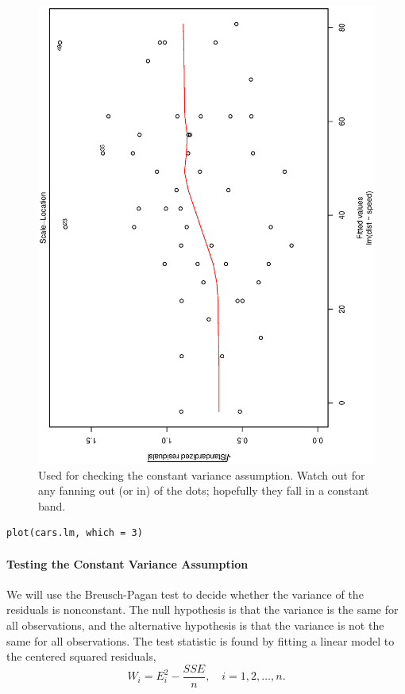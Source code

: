 \documentclass[captions=tableheading]{scrbook}
\begin{document}
\begin{figure}[th]
  \includegraphics[angle=270, totalheight=4in]{img/std-resids-fitted-cars.ps}
  \caption[Plot of standardized residuals against the fitted values for the \texttt{cars} data]{\small Used for checking the constant variance assumption. Watch out for any fanning out (or in) of the dots; hopefully they fall in a constant band.}
  \label{fig:std-resids-fitted-cars}
\end{figure}


\begin{verbatim}
plot(cars.lm, which = 3)
\end{verbatim}

\paragraph*{Testing the Constant Variance Assumption}

We will use the Breusch-Pagan test to decide whether the variance of the residuals is nonconstant. The null hypothesis is that the variance is the same for all observations, and the alternative hypothesis is that the variance is not the same for all observations. The test statistic is found by fitting a linear model to the centered squared residuals,
\begin{equation}
W_{i} = E_{i}^{2} - \frac{SSE}{n}, \quad i=1,2,\ldots,n.
\end{equation}
\end{document}
